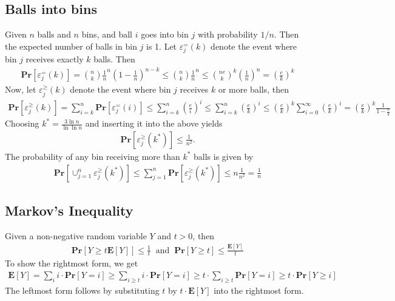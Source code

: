 \documentclass[12pt]{article}
\begin{document}
\subsection*{Balls into bins}
Given $n$ balls and $n$ bins, and ball $i$ goes into bin $j$ with probability $1/n$. Then the expected number of balls in bin $j$ is 1. Let $\varepsilon^=_j(k)$ denote the event where bin $j$ receives exactly $k$ balls. Then
\begin{align*}
\mathbf{Pr}\left[ \varepsilon^=_j(k) \right] = \binom{n}{k}\frac{1}{n}^n \left( 1-\frac{1}{n} \right)^{n-k} \leq \binom{n}{k}\frac{1}{n}^n \leq \binom{ne}{k}^k \left( \frac{1}{n} \right)^n = \left(\frac{e}{k}\right)^k 
\end{align*}
Now, let $\varepsilon^\geq_j(k)$ denote the event where bin $j$ receives $k$ or more balls, then
\begin{align*}
\mathbf{Pr}\left[ \varepsilon^\geq_j(k) \right] = \sum_{i=k}^{n} \mathbf{Pr}\left[ \varepsilon^=_j(i) \right] \leq \sum_{i=k}^{n} \left(\frac{e}{i}\right)^i \leq \sum_{i=k}^{n} \left(\frac{e}{k}\right)^i \leq \left(\frac{e}{k}\right)^k \sum_{i=0}^{\infty} \left( \frac{e}{k} \right)^i = \left( \frac{e}{k} \right)^k \frac{1}{1-\frac{e}{k}}
\end{align*}
Choosing $k^*=\frac{3 \ln n}{\ln \ln n}$ and inserting it into the above yields
\begin{align*}
\mathbf{Pr}\left[ \varepsilon_j^\geq(k^*) \right] \leq \frac{1}{n^2}.
\end{align*}
The probability of any bin receiving more than $k^*$ balls is given by
\begin{align*}
\mathbf{Pr}\left[ \cup_{j=1}^{n} \varepsilon_j^\geq(k^*) \right] \leq \sum_{j=1}^n \mathbf{Pr}\left[ \varepsilon_j^\geq(k^*) \right] \leq n \frac{1}{n^2} = \frac{1}{n}
\end{align*}

\subsection*{Markov's Inequality}
Given a non-negative random variable $Y$ and $t > 0$, then
\begin{align*}
\mathbf{Pr}\left[ Y \geq t \mathbf{E}\left[ Y \right] \right] \leq \frac{1}{t} \;\; \mathrm{ and } \;\; \mathbf{Pr}\left[ Y \geq t \right] \leq \frac{\mathbf{E}\left[ Y \right]}{t}
\end{align*}
To show the rightmost form, we get
\begin{align*}
\mathbf{E}\left[ Y \right] = \sum_{i} i \cdot \mathbf{Pr}\left[ Y=i \right] \geq \sum_{i \geq t} i \cdot \mathbf{Pr}\left[ Y=i \right] \geq t \cdot \sum_{i \geq t} \mathbf{Pr}\left[ Y=i \right] \geq t \cdot \mathbf{Pr}\left[ Y \geq i \right] 
\end{align*}
The leftmost form follows by substituting $t$ by $t \cdot \mathbf{E}\left[ Y \right]$ into the rightmost form.
\end{document}
